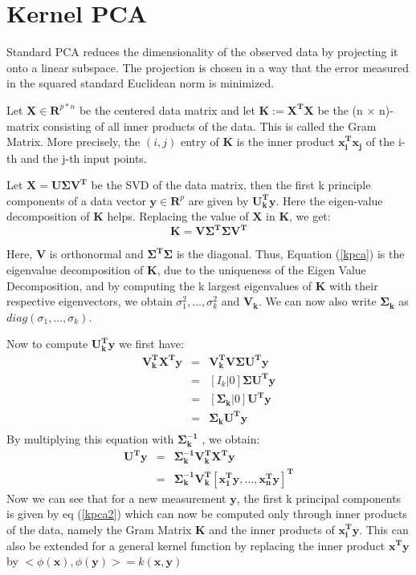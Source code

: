 \documentclass{article}
\begin{document}
\section{Kernel PCA}
Standard PCA reduces the dimensionality of the observed data by projecting it onto a linear subspace. The projection is chosen in a way that the error measured in the squared standard Euclidean norm is minimized.

Let $\bm{X} \in \bm{R}^{p * n}$ be the centered data matrix and let $\bm{K} := \bm{X^T X}$ be the (n × n)-matrix consisting of all inner products of the data. This is called the Gram Matrix. More precisely, the $(i, j)$ entry of $\bm{K}$ is the inner product $\bm{x_i^T x_j}$ of the i-th and the j-th input points.

Let $\bm{X} = \bm{U \Sigma V^T}$ be the SVD of the data matrix, then the first k principle components of a data vector $\bm{y} \in \bm{R}^p$ are given by $\bm{U_k^T y}$. Here the eigen-value decomposition of $\bm{K}$ helps. Replacing the value of $\bm{X}$ in $\bm{K}$, we get: 
\begin{equation}
\label{kpca}
\bm{K} = \bm{V \Sigma^T \Sigma V^T}    
\end{equation}

Here, $\bm{V}$ is orthonormal and $\bm{\Sigma^T \Sigma}$ is the diagonal. Thus, Equation (\ref{kpca}) is the eigenvalue decomposition of $\bm{K}$, due to the uniqueness of the Eigen Value Decomposition, and by computing the k largest eigenvalues of $\bm{K}$ with their respective eigenvectors, we obtain $\sigma_1^2 ,..., \sigma_k^2$ and $\bm{V_k}$. We can now also write $\bm{\Sigma_k}$ as $diag(\sigma_1 ,..., \sigma_k).$

Now to compute $\bm{U_k^T y}$ we first have:
\begin{eqnarray*}
    \bm{V_k^T X^T y} & = & \bm{V_k^T V \Sigma U^T y}\\
    & = & [ I_k | 0] \bm{\Sigma U^T y}\\
    & = & [ \bm{\Sigma_k} | 0] \bm{U^T y}\\
        & = & \bm{\Sigma_k} \bm{U^T y}\\
\end{eqnarray*}
By multiplying this equation with $\bm{\Sigma_k^{−1}}$ , we obtain: 
\begin{eqnarray}
\label{kpca2}
    \bm{U^T y} &=& \bm{\Sigma_k^{−1}} \bm{V_k^T X^T y} \nonumber \\  &=&\bm{\Sigma_k^{−1}} \bm{V_k^T} [\bm{x_1^T y},..., \bm{x_n^T y}]^{\bm{T}}
\end{eqnarray}
Now we can see that for a new measurement $\bm{y}$, the first k principal components is given by eq (\ref{kpca2}) which can now be computed only through inner products of the data, namely the Gram Matrix $\bm{K}$ and the inner products of $\bm{x_i^T y}$. This can also be extended for a general kernel function by replacing the inner product $\bm{x^Ty}$ by $<\phi(\bm{x}), \phi(\bm{y})> = k(\bm{x},\bm{y})$
\end{document}
